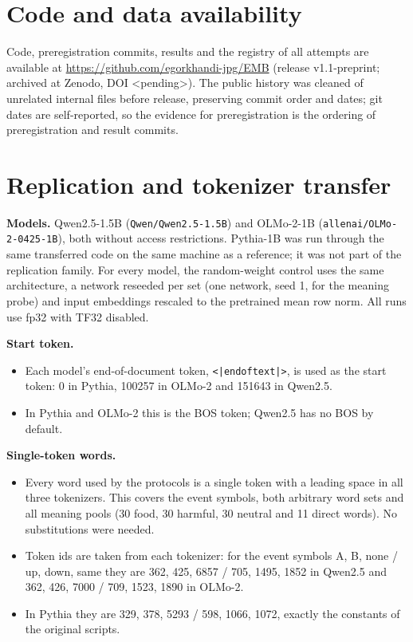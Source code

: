 \documentclass[11pt]{article}
\begin{document}
\section*{Code and data availability}
Code, preregistration commits, results and the registry of all attempts are available at \url{https://github.com/egorkhandi-jpg/EMB} (release v1.1-preprint; archived at Zenodo, DOI \mbox{<pending>}). The public history was cleaned of unrelated internal files before release, preserving commit order and dates; git dates are self-reported, so the evidence for preregistration is the ordering of preregistration and result commits.



\appendix
\section{Replication and tokenizer transfer}



\textbf{Models.} Qwen2.5-1.5B (\texttt{Qwen/Qwen2.5-1.5B}) and OLMo-2-1B (\texttt{allenai/OLMo-2-0425-1B}), both without access restrictions. Pythia-1B was run through the same transferred code on the same machine as a reference; it was not part of the replication family. For every model, the random-weight control uses the same architecture, a network reseeded per set (one network, seed 1, for the meaning probe) and input embeddings rescaled to the pretrained mean row norm. All runs use fp32 with TF32 disabled.

\textbf{Start token.}
\begin{itemize}
\item Each model's end-of-document token, \texttt{<|endoftext|>}, is used as the start token: 0 in Pythia, 100257 in OLMo-2 and 151643 in Qwen2.5.
\item In Pythia and OLMo-2 this is the BOS token; Qwen2.5 has no BOS by default.
\end{itemize}

\textbf{Single-token words.}
\begin{itemize}
\item Every word used by the protocols is a single token with a leading space in all three tokenizers. This covers the event symbols, both arbitrary word sets and all meaning pools (30 food, 30 harmful, 30 neutral and 11 direct words). No substitutions were needed.
\item Token ids are taken from each tokenizer: for the event symbols A, B, none / up, down, same they are 362, 425, 6857 / 705, 1495, 1852 in Qwen2.5 and 362, 426, 7000 / 709, 1523, 1890 in OLMo-2.
\item In Pythia they are 329, 378, 5293 / 598, 1066, 1072, exactly the constants of the original scripts.
\end{itemize}
\end{document}
